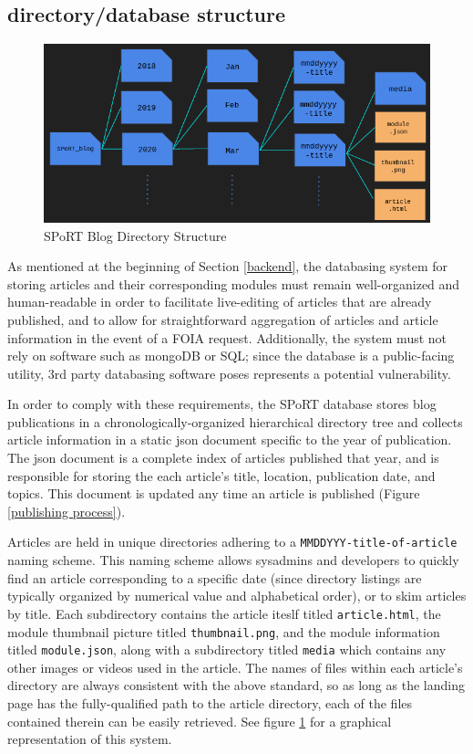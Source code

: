 \documentclass[12pt]{article}
\begin{document}
\newpage
\subsection{directory/database structure}
\label{database}

\begin{figure}[h]
  \centering
  \includegraphics[width=.8\linewidth]{./figures/directories.png}
  \caption{SPoRT Blog Directory Structure}
  \label{directories} %
\end{figure}

As mentioned at the beginning of Section \ref{backend}, the databasing system for storing articles  and their corresponding modules must remain well-organized and human-readable in order to facilitate live-editing of articles that are already published, and to allow for straightforward aggregation of articles and article information in the event of a FOIA request. Additionally, the system must not rely on software such as mongoDB or SQL; since the database is a public-facing utility, 3rd party databasing software poses represents a potential vulnerability.

In order to comply with these requirements, the SPoRT database stores blog publications in a chronologically-organized hierarchical directory tree and collects article information in a static json document specific to the year of publication. The json document is a complete index of articles published that year, and is responsible for storing the each article's title, location, publication date, and topics. This document is updated any time an article is published (Figure \ref{publishing process}).

Articles are held in unique directories adhering to a \texttt{MMDDYYY-title-of-article}  naming scheme. This naming scheme allows sysadmins and developers to quickly find an article corresponding to a specific date (since directory listings are typically organized by numerical value and alphabetical order), or to skim articles by title. Each subdirectory contains the article iteslf titled \texttt{article.html}, the module thumbnail picture titled \texttt{thumbnail.png}, and the module information titled \texttt{module.json}, along with a subdirectory titled \texttt{media} which contains any other images or videos used in the article. The names of files within each article's directory are always consistent with the above standard, so as long as the landing page has the fully-qualified path to the article directory, each of the files contained therein can be easily retrieved. See figure \ref{directories} for a graphical representation of this system.
\end{document}
